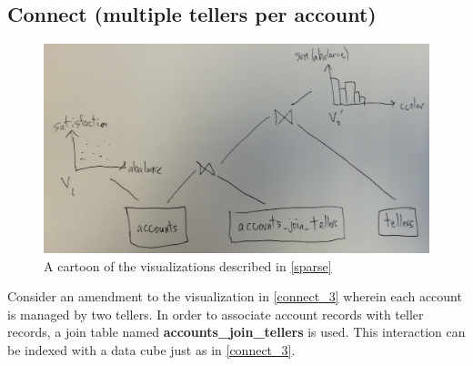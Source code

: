 \subsection{Connect (multiple tellers per account)}\label{sparse}
\begin{figure}[H]
	\includegraphics[width=\columnwidth]{figures/sparse}
	\caption{A cartoon of the visualizations described in \autoref{sparse}
	}
	\label{fig_sparse}
\end{figure}
Consider an amendment to the visualization in \autoref{connect_3} wherein each account is managed by two tellers.
In order to associate account records with teller records, a join table named \textbf{accounts\_join\_tellers} is used.
This interaction can be indexed with a data cube just as in \autoref{connect_3}.
